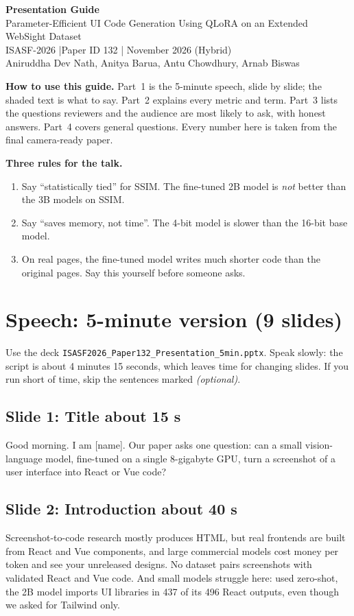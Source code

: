 \documentclass[11pt,a4paper]{article}
\newcommand{\slide}[3]{\subsection*{Slide #1: #2 \hfill\normalfont\small\color{teal}about #3}}
\newcommand{\say}[1]{\par\noindent\colorbox{tint}{\parbox{\dimexpr\linewidth-2\fboxsep}{#1}}\par}
\begin{document}
\begin{center}
{\LARGE\bfseries\color{navy} Presentation Guide}\\[4pt]
{\large Parameter-Efficient UI Code Generation Using QLoRA on an Extended WebSight Dataset}\\[4pt]
ISASF-2026 \quad|\quad Paper ID 132 \quad| November 2026 (Hybrid)\\[2pt]
{\small Aniruddha Dev Nath, Anitya Barua, Antu Chowdhury, Arnab Biswas}
\end{center}

\medskip
\noindent\textbf{How to use this guide.} Part~1 is the 5-minute speech, slide by slide;
the shaded text is what to say. Part~2 explains every metric and term. Part~3 lists the questions
reviewers and the audience are most likely to ask, with honest answers. Part~4 covers general questions.
Every number here is taken from the final camera-ready paper.

\medskip
\noindent\textbf{Three rules for the talk.}
\begin{enumerate}
\item Say ``statistically tied'' for SSIM. The fine-tuned 2B model is \emph{not} better than the 3B models on SSIM.
\item Say ``saves memory, not time''. The 4-bit model is slower than the 16-bit base model.
\item On real pages, the fine-tuned model writes much shorter code than the original pages. Say this yourself before someone asks.
\end{enumerate}

\section{Speech: 5-minute version (9 slides)}

Use the deck \texttt{ISASF2026\_Paper132\_Presentation\_5min.pptx}. Speak slowly: the script is about
4 minutes 15 seconds, which leaves time for changing slides. If you run short of time, skip the sentences marked
\textit{(optional)}.

\slide{1}{Title}{15 s}
\say{Good morning. I am [name]. Our paper asks one question: can a small vision-language model, fine-tuned on a
single 8-gigabyte GPU, turn a screenshot of a user interface into React or Vue code?}

\slide{2}{Introduction}{40 s}
\say{Screenshot-to-code research mostly produces HTML, but real frontends are built from React and Vue components,
and large commercial models cost money per token and see your unreleased designs.
No dataset pairs screenshots with validated React and Vue code. And small models struggle here: used zero-shot,
the 2B model imports UI libraries in 437 of its 496 React outputs, even though we asked for Tailwind only.}
\end{document}
